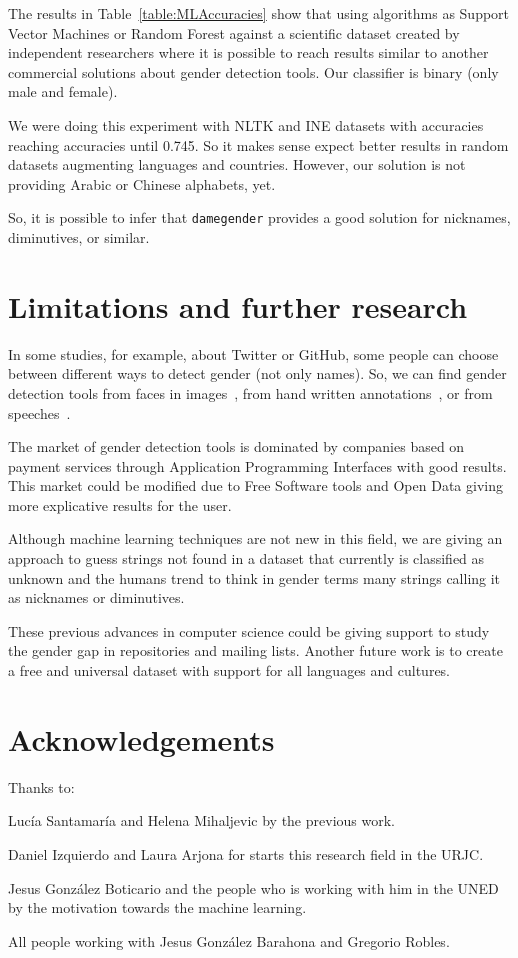 \documentclass[a4paper]{article}
\begin{document}
The results in Table~\ref{table:MLAccuracies} show that using algorithms as Support Vector Machines or Random Forest against a scientific dataset created by independent researchers where it is possible to reach results similar to another commercial solutions about gender detection tools.
Our classifier is binary (only male and female).

We were doing this experiment with NLTK and INE datasets with accuracies reaching accuracies until 0.745.
So it makes sense expect better results in random datasets augmenting languages and countries.
However, our solution is not providing Arabic or Chinese alphabets, yet.

So, it is possible to infer that \texttt{damegender} provides a good solution for nicknames, diminutives, or similar.


\section{Limitations and further research}

In some studies, for example, about Twitter or GitHub, some people can choose between different ways to detect gender (not only names). 
So, we can find gender detection tools from faces in images~\cite{ranjan2017hyperface}, from hand written annotations~\cite{liwicki2011automatic}, or from speeches~\cite{koppel2002automatically}.


The market of gender detection tools is dominated by companies based on payment services through Application Programming Interfaces with good results. 
This market could be modified due to Free Software tools and Open Data giving more explicative results for the user.

Although machine learning techniques are not new in this field, we are giving an approach to guess strings not found in a dataset that currently is classified as unknown and the humans trend to think in gender terms many strings calling it as nicknames or diminutives.

These previous advances in computer science could be giving support to study the gender gap in repositories and mailing lists.
Another future work is to create a free and universal dataset with support for all languages and cultures.



\section*{Acknowledgements}

Thanks to:

Lucía Santamaría and Helena Mihaljevic by the previous work.

Daniel Izquierdo and Laura Arjona for starts this research field in the URJC.

Jesus González Boticario and the people who is working with him in the UNED by the motivation towards the machine learning.

All people working with Jesus González Barahona and Gregorio Robles.

 

\end{document}
